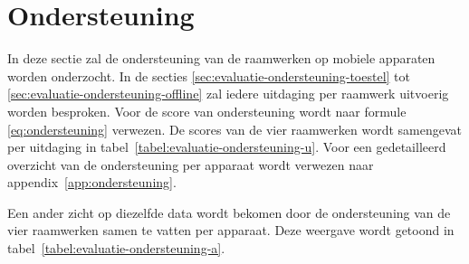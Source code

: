 \section{Ondersteuning}
\label{sec:evaluatie-ondersteuning}

In deze sectie zal de ondersteuning van de raamwerken op mobiele apparaten worden onderzocht.
In de secties \ref{sec:evaluatie-ondersteuning-toestel} tot \ref{sec:evaluatie-ondersteuning-offline} zal iedere uitdaging per raamwerk uitvoerig worden besproken.
Voor de score van ondersteuning wordt naar formule \ref{eq:ondersteuning} verwezen.
De scores van de vier raamwerken wordt samengevat per uitdaging in tabel~\ref{tabel:evaluatie-ondersteuning-u}.
Voor een gedetailleerd overzicht van de ondersteuning per apparaat wordt verwezen naar appendix~\ref{app:ondersteuning}.

\begin{table}[H]
\centering
\resizebox{14cm}{!} {
}
\caption{Ondersteuning per uitdaging.}
\label{tabel:evaluatie-ondersteuning-u}
\end{table}

Een ander zicht op diezelfde data wordt bekomen door de ondersteuning van de vier raamwerken samen te vatten per apparaat.
Deze weergave wordt getoond in tabel~\ref{tabel:evaluatie-ondersteuning-a}.

